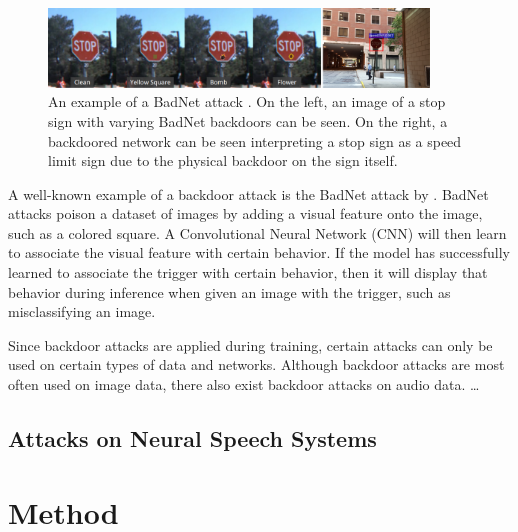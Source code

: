 \documentclass[11pt]{article}
\begin{document}
\begin{figure}[h]
  \centering
  \includegraphics[width=0.9\textwidth]{badnet.png}
  \caption{An example of a BadNet attack \citep{gu2019badnets}. On the left, an image of a stop sign with varying BadNet backdoors can be seen. On the right, a backdoored network can be seen interpreting a stop sign as a speed limit sign due to the physical backdoor on the sign itself.}
  \label{fig:badnet}
\end{figure}

A well-known example of a backdoor attack is the BadNet attack by \citet{gu2019badnets}.
BadNet attacks poison a dataset of images by adding a visual feature onto the image, such as a colored square.
A Convolutional Neural Network (CNN) will then learn to associate the visual feature with certain behavior.
If the model has successfully learned to associate the trigger with certain behavior, then it will display that behavior during inference when given an image with the trigger, such as misclassifying an image.

Since backdoor attacks are applied during training, certain attacks can only be used on certain types of data and networks.
Although backdoor attacks are most often used on image data, there also exist backdoor attacks on audio data.
\dots %
\citet{liu2018trojaning} %
\citet{stefanos2022ultrasonic} %

\citet{stefanos2023jingleback} %

\subsection{Attacks on Neural Speech Systems}
\citet{neekhara2019universal} %

\citet{kreuk2018fooling} %

\section{Method}
\citet{kai2022lightweight} %
\end{document}
